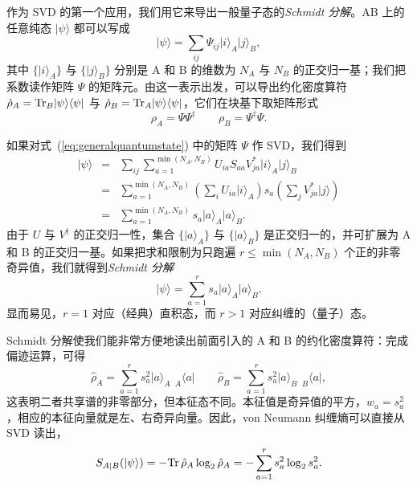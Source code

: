 \documentclass[a4paper,10pt,oneside,onecolumn,1p,times]{elsarticle}
\newcommand{\tr}{{\rm Tr }}
\newcommand{\bra}[1]{\mbox{$\langle #1  |$}}
\newcommand{\ket}[1]{\mbox{$| #1  \rangle$}}
\begin{document}
作为 SVD 的第一个应用，我们用它来导出一般量子态的{\em Schmidt 分解}。AB 上的任意纯态 
$\ket{\psi}$
都可以写成
\begin{equation}
\ket{\psi} = \sum_{ij} \Psi_{ij} \ket{i}_A \ket{j}_B,
\label{eq:generalquantumstate}
\end{equation}
其中 $\{ \ket{i}_A \}$ 与 $\{ \ket{j}_B \}$ 分别是 A 和 B 的维数为 $N_A$ 与 $N_B$ 的正交归一基；我们把系数读作矩阵 $\Psi$ 的矩阵元。由这一表示出发，可以导出约化密度算符 $\hat{\rho}_A = \tr_B \ket{\psi}\bra{\psi}$ 与 $\hat{\rho}_B = \tr_A \ket{\psi}\bra{\psi}$，它们在块基下取矩阵形式 
\begin{equation} 
\rho_A = \Psi \Psi^\dagger \quad\quad \rho_B = \Psi^\dagger\Psi .
\end{equation}

如果对式~(\ref{eq:generalquantumstate}) 中的矩阵 $\Psi$ 作 SVD，我们得到
\begin{eqnarray}
\ket{\psi} &=& \sum_{ij} \sum_{a=1}^{\min(N_A,N_B)} U_{ia} S_{aa} V^*_{ja} \ket{i}_A \ket{j}_B \nonumber \\
&=& \sum_{a=1}^{\min(N_A,N_B)} \left( \sum_i U_{ia} \ket{i}_A \right) s_a \left( \sum_j V_{ja}^* \ket{j} \right) \nonumber \\
&=& \sum_{a=1}^{\min(N_A,N_B)} s_a \ket{a}_A \ket{a}_B .
\end{eqnarray}
由于 $U$ 与 $V^\dagger$ 的正交归一性，集合 $\{ \ket{a}_A \}$ 与 $\{ \ket{a}_B \}$ 是正交归一的，并可扩展为 A 和 B 的正交归一基。如果把求和限制为只跑遍 $r \leq \min(N_A,N_B)$ 个正的非零奇异值，我们就得到{\em Schmidt 分解}
\begin{equation}
\ket{\psi} = \sum_{a=1}^r s_a \ket{a}_A \ket{a}_B .
\end{equation}
显而易见，$r=1$ 对应（经典）直积态，而 $r>1$ 对应纠缠的（量子）态。

Schmidt 分解使我们能非常方便地读出前面引入的 A 和 B 的约化密度算符：完成偏迹运算，可得
\begin{equation}
\hat{\rho}_A = \sum_{a=1}^r s^2_a \ket{a}_A  \phantom\rangle_A \bra{a} \quad\quad \hat{\rho}_B = \sum_{a=1}^r s^2_a \ket{a}_B \phantom\rangle_B \bra{a} ,
\end{equation}
这表明二者共享谱的非零部分，但本征态不同。本征值是奇异值的平方，$w_a = s^2_a$，相应的本征向量就是左、右奇异向量。因此，von Neumann 纠缠熵可以直接从 SVD 读出，
\begin{equation}
S_{A|B}(\ket{\psi}) = - \tr\, \hat{\rho}_A \log_2 \hat{\rho}_A = - \sum_{a=1}^r s_a^2 \log_2 s_a^2 .
\end{equation}
\end{document}
